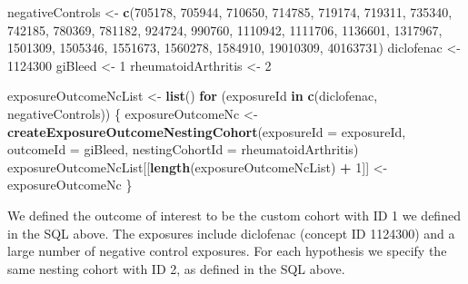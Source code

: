 \documentclass[]{article}
\newenvironment{Shaded}{\begin{snugshade}}{\end{snugshade}}
\newcommand{\ControlFlowTok}[1]{\textcolor[rgb]{0.13,0.29,0.53}{\textbf{#1}}}
\newcommand{\DataTypeTok}[1]{\textcolor[rgb]{0.13,0.29,0.53}{#1}}
\newcommand{\DecValTok}[1]{\textcolor[rgb]{0.00,0.00,0.81}{#1}}
\newcommand{\KeywordTok}[1]{\textcolor[rgb]{0.13,0.29,0.53}{\textbf{#1}}}
\newcommand{\NormalTok}[1]{#1}
\newcommand{\OperatorTok}[1]{\textcolor[rgb]{0.81,0.36,0.00}{\textbf{#1}}}
\newcommand{\StringTok}[1]{\textcolor[rgb]{0.31,0.60,0.02}{#1}}
\begin{document}
\begin{Shaded}
\begin{Highlighting}[]
\NormalTok{negativeControls <-}\StringTok{ }\KeywordTok{c}\NormalTok{(}\DecValTok{705178}\NormalTok{,}
                      \DecValTok{705944}\NormalTok{,}
                      \DecValTok{710650}\NormalTok{,}
                      \DecValTok{714785}\NormalTok{,}
                      \DecValTok{719174}\NormalTok{,}
                      \DecValTok{719311}\NormalTok{,}
                      \DecValTok{735340}\NormalTok{,}
                      \DecValTok{742185}\NormalTok{,}
                      \DecValTok{780369}\NormalTok{,}
                      \DecValTok{781182}\NormalTok{,}
                      \DecValTok{924724}\NormalTok{,}
                      \DecValTok{990760}\NormalTok{,}
                      \DecValTok{1110942}\NormalTok{,}
                      \DecValTok{1111706}\NormalTok{,}
                      \DecValTok{1136601}\NormalTok{,}
                      \DecValTok{1317967}\NormalTok{,}
                      \DecValTok{1501309}\NormalTok{,}
                      \DecValTok{1505346}\NormalTok{,}
                      \DecValTok{1551673}\NormalTok{,}
                      \DecValTok{1560278}\NormalTok{,}
                      \DecValTok{1584910}\NormalTok{,}
                      \DecValTok{19010309}\NormalTok{,}
                      \DecValTok{40163731}\NormalTok{)}
\NormalTok{diclofenac <-}\StringTok{ }\DecValTok{1124300}
\NormalTok{giBleed <-}\StringTok{ }\DecValTok{1}
\NormalTok{rheumatoidArthritis <-}\StringTok{ }\DecValTok{2}

\NormalTok{exposureOutcomeNcList <-}\StringTok{ }\KeywordTok{list}\NormalTok{()}
\ControlFlowTok{for}\NormalTok{ (exposureId }\ControlFlowTok{in} \KeywordTok{c}\NormalTok{(diclofenac, negativeControls)) \{}
\NormalTok{  exposureOutcomeNc <-}\StringTok{ }\KeywordTok{createExposureOutcomeNestingCohort}\NormalTok{(}\DataTypeTok{exposureId =}\NormalTok{ exposureId,}
                                                          \DataTypeTok{outcomeId =}\NormalTok{ giBleed,}
                                                          \DataTypeTok{nestingCohortId =}\NormalTok{ rheumatoidArthritis)}
\NormalTok{  exposureOutcomeNcList[[}\KeywordTok{length}\NormalTok{(exposureOutcomeNcList) }\OperatorTok{+}\StringTok{ }\DecValTok{1}\NormalTok{]] <-}\StringTok{ }\NormalTok{exposureOutcomeNc}
\NormalTok{\}}
\end{Highlighting}
\end{Shaded}

We defined the outcome of interest to be the custom cohort with ID 1 we
defined in the SQL above. The exposures include diclofenac (concept ID
1124300) and a large number of negative control exposures. For each
hypothesis we specify the same nesting cohort with ID 2, as defined in
the SQL above.
\end{document}
